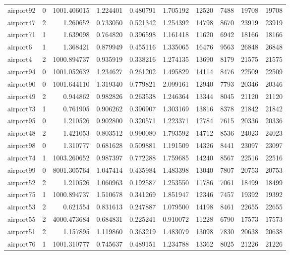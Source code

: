 \begin{longtable}{|l|r|r|r|r|r|r|r|r|r|}
airport92 & 0 & 1001.406015 & 1.224401 & 0.480791 & 1.705192 & 12520 & 7488 & 19708 & 19708 \\
airport47 & 2 & 1.260652 & 0.733050 & 0.521342 & 1.254392 & 14798 & 8670 & 23919 & 23919 \\
airport71 & 1 & 1.639098 & 0.764820 & 0.396598 & 1.161418 & 11620 & 6942 & 18166 & 18166 \\
airport6 & 1 & 1.368421 & 0.879949 & 0.455116 & 1.335065 & 16476 & 9563 & 26848 & 26848 \\
airport4 & 2 & 1000.894737 & 0.935919 & 0.338216 & 1.274135 & 13690 & 8179 & 21575 & 21575 \\
airport94 & 0 & 1001.052632 & 1.234627 & 0.261202 & 1.495829 & 14114 & 8476 & 22509 & 22509 \\
airport90 & 0 & 1001.644110 & 1.319340 & 0.779821 & 2.099161 & 12940 & 7793 & 20346 & 20346 \\
airport49 & 2 & 0.944862 & 0.982826 & 0.263538 & 1.246364 & 13344 & 8045 & 21120 & 21120 \\
airport73 & 1 & 0.761905 & 0.906262 & 0.396907 & 1.303169 & 13816 & 8378 & 21842 & 21842 \\
airport95 & 0 & 1.210526 & 0.902800 & 0.320571 & 1.223371 & 12784 & 7615 & 20336 & 20336 \\
airport48 & 2 & 1.421053 & 0.803512 & 0.990080 & 1.793592 & 14712 & 8536 & 24023 & 24023 \\
airport98 & 0 & 1.310777 & 0.681628 & 0.509881 & 1.191509 & 14326 & 8441 & 23097 & 23097 \\
airport74 & 1 & 1003.260652 & 0.987397 & 0.772288 & 1.759685 & 14240 & 8567 & 22516 & 22516 \\
airport99 & 0 & 8001.305764 & 1.047414 & 0.435984 & 1.483398 & 13040 & 7807 & 20753 & 20753 \\
airport52 & 2 & 1.210526 & 1.060963 & 0.192587 & 1.253550 & 11786 & 7061 & 18499 & 18499 \\
airport75 & 1 & 1000.894737 & 1.510678 & 0.341269 & 1.851947 & 12346 & 7457 & 19392 & 19392 \\
airport53 & 2 & 0.621554 & 0.831613 & 0.247887 & 1.079500 & 14198 & 8461 & 22655 & 22655 \\
airport55 & 2 & 4000.473684 & 0.684831 & 0.225241 & 0.910072 & 11228 & 6790 & 17573 & 17573 \\
airport51 & 2 & 1.157895 & 1.119860 & 0.363219 & 1.483079 & 13098 & 7830 & 20638 & 20638 \\
airport76 & 1 & 1001.310777 & 0.745637 & 0.489151 & 1.234788 & 13362 & 8025 & 21226 & 21226 \\

\end{longtable}
